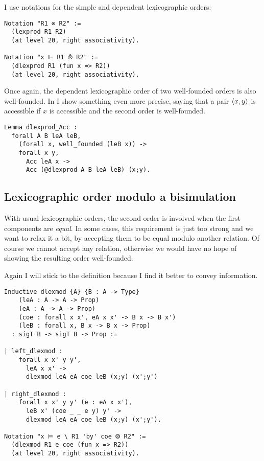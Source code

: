 I use notations for the simple and dependent lexicographic orders:
\begin{verbatim}
Notation "R1 ⊗ R2" :=
  (lexprod R1 R2)
  (at level 20, right associativity).

Notation "x ⊩ R1 ⨶ R2" :=
  (dlexprod R1 (fun x => R2))
  (at level 20, right associativity).
\end{verbatim}

Once again, the dependent lexicographic order of two well-founded orders is also
well-founded. In \Coq I show something even more precise, saying that a pair
\(\langle x,y \rangle\) is accessible if \(x\) is accessible and the second order is
well-founded.
\begin{verbatim}
Lemma dlexprod_Acc :
  forall A B leA leB,
    (forall x, well_founded (leB x)) ->
    forall x y,
      Acc leA x ->
      Acc (@dlexprod A B leA leB) (x;y).
\end{verbatim}


\subsection{Lexicographic order modulo a bisimulation}

With usual lexicographic orders, the second order is involved when the first
components are \emph{equal}. In some cases, this requirement is just too strong
and we want to relax it a bit, by accepting them to be equal modulo another
relation. Of course we cannot accept any relation, otherwise we would have no
hope of showing the resulting order well-founded.

Again I will stick to the \Coq definition because I find it better to convey
information.

\begin{verbatim}
Inductive dlexmod {A} {B : A -> Type}
    (leA : A -> A -> Prop)
    (eA : A -> A -> Prop)
    (coe : forall x x', eA x x' -> B x -> B x')
    (leB : forall x, B x -> B x -> Prop)
  : sigT B -> sigT B -> Prop :=

| left_dlexmod :
    forall x x' y y',
      leA x x' ->
      dlexmod leA eA coe leB (x;y) (x';y')

| right_dlexmod :
    forall x x' y y' (e : eA x x'),
      leB x' (coe _ _ e y) y' ->
      dlexmod leA eA coe leB (x;y) (x';y').

Notation "x ⊨ e \ R1 'by' coe ⨷ R2" :=
  (dlexmod R1 e coe (fun x => R2))
  (at level 20, right associativity).
\end{verbatim}


